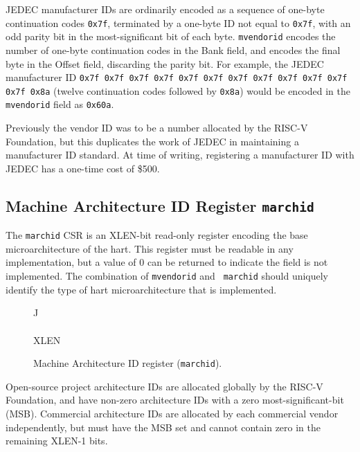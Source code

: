 JEDEC manufacturer IDs are ordinarily encoded as a sequence of one-byte
continuation codes {\tt 0x7f}, terminated by a one-byte ID not equal to
{\tt 0x7f}, with an odd parity bit in the most-significant bit of each byte.
{\tt mvendorid} encodes the number of one-byte continuation
codes in the Bank field, and encodes the final byte in the Offset field,
discarding the parity bit.  For example, the JEDEC manufacturer ID
{\tt 0x7f 0x7f 0x7f 0x7f 0x7f 0x7f 0x7f 0x7f 0x7f 0x7f 0x7f 0x7f 0x8a}
(twelve continuation codes followed by {\tt 0x8a}) would be encoded in the
{\tt mvendorid} field as {\tt 0x60a}.

\begin{commentary}
Previously the vendor ID was to be a number allocated by the RISC-V
Foundation, but this duplicates the work of JEDEC in maintaining a
manufacturer ID standard.  At time of writing, registering a
manufacturer ID with JEDEC has a one-time cost of \$500.
\end{commentary}

\subsection{Machine Architecture ID Register {\tt marchid}}

The {\tt marchid} CSR is an XLEN-bit read-only register encoding the
base microarchitecture of the hart.  This register must be readable in
any implementation, but a value of 0 can be returned to indicate the
field is not implemented.  The combination of {\tt mvendorid} and {\tt
  marchid} should uniquely identify the type of hart microarchitecture
that is implemented.

\begin{figure*}[h!]
{\footnotesize
\begin{center}
\begin{tabular}{J}
 \\
\hline
{} \\
\hline
XLEN \\
\end{tabular}
\end{center}
}
\vspace{-0.1in}
\caption{Machine Architecture ID register ({\tt marchid}).}
\label{marchreg}
\end{figure*}

Open-source project architecture IDs are allocated globally by the
RISC-V Foundation, and have non-zero architecture IDs with a zero
most-significant-bit (MSB).  Commercial architecture IDs are allocated
by each commercial vendor independently, but must have the MSB set and
cannot contain zero in the remaining XLEN-1 bits.

